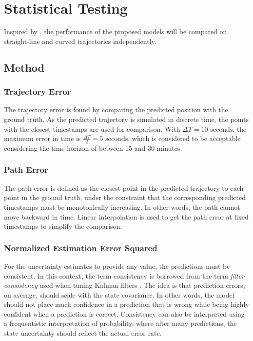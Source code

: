 \chapter{Statistical Testing}\label{chap:stat_testing}
Inspired by \cite{hexeberg}, the performance of the proposed models will be compared on straight-line and curved trajectories independently.

\section{Method}
\subsection{Trajectory Error}
The trajectory error is found by comparing the predicted position with the ground truth. As the predicted trajectory is simulated in discrete time, the points with the closest timestamps are used for comparison. With $\Delta T = 10\text{ seconds}$, the maximum error in time is $\frac{\Delta T}{2} = 5 \text{ seconds}$, which is considered to be acceptable considering the time-horizon of between $15$ and $30$ minutes.
\subsection{Path Error}
The path error is defined as the closest point in the predicted trajectory to each point in the ground truth, under the constraint that the corresponding predicted timestamps must be monotonically increasing. In other words, the path cannot move backward in time. Linear interpolation is used to get the path error at fixed timestamps to simplify the comparison.

\subsection{Normalized Estimation Error Squared}
For the uncertainty estimates to provide any value, the predictions must be consistent. In this context, the term consistency is borrowed from the term \textit{filter consistency} used when tuning Kalman filters \cite{sensorfusjon}. The idea is that prediction errors, on average, should scale with the state covariance. In other words, the model should not place much confidence in a prediction that is wrong while being highly confident when a prediction is correct. Consistency can also be interpreted using a frequentistic interpretation of probability, where after many predictions, the state uncertainty should reflect the actual error rate.

